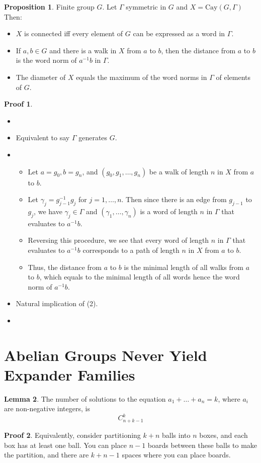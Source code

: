 \documentclass{book}
\newcommand{\Cay}[1]{\textrm{Cay}( #1 )}
\theoremstyle{definition}
\newtheorem{lemma}{Lemma}[chapter]
\newtheorem{proposition}[lemma]{Proposition}
\theoremstyle{remarkstyle}
\newtheorem*{myproof}{Proof}%
\begin{document}
\begin{proposition}
    Finite group $G$. Let $\Gamma$ symmetric in $G$ and $X = \Cay{G, \Gamma}$ Then:
    \begin{itemize}
        \item[1] $X$ is connected iff every element of $G$ can be expressed as a word in $\Gamma$.
        \item[2] If $a,b\in G$ and there is a walk in $X$ from $a$ to $b$, then the distance from $a$ to $b$ is the word norm of $a^{-1}b $ in $\Gamma$.
        \item[3] The diameter of $X$ equals the maximum of the word norms in $\Gamma$ of elements of $G$.  
    \end{itemize}
\end{proposition}
\begin{myproof}
    \begin{itemize}
        \item[]
        \item[1] Equivalent to say $\Gamma$ generates $G$.
        \item[2] 
        \begin{itemize}
            \item Let $a = g_{0}, b=g_{n} $, and $(g_{0}, g_{1}, \dots, g_{n}) $ be a walk of length $n$ in $X$ from $a$ to $b$. 
            \item Let $\gamma_{j} = g^{-1}_{j-1}g_{j} $ for $j = 1, \dots, n$. Then since there is an edge from $g_{j-1} $ to $g_{j} $, we have $\gamma_{j} \in \Gamma $ and $(\gamma_{1}, \dots, \gamma_{n}) $ is a word of length $n$ in $\Gamma$ that evaluates to $a^{-1}b $. 
            \item Reversing this procedure, we see that every word of length $n$ in $\Gamma$ that evaluates to $a^{-1}b $ corresponds to a path of length $n$ in $X$ from $a$ to $b$. 
            \item Thus, the distance from $a$ to $b$ is the minimal length of all walks from $a$ to $b$, which equals to the minimal length of all words hence the word norm of $a^{-1}b$.
        \end{itemize}
        \item[3] Natural implication of (2).
        \item[] 
    \end{itemize}
\end{myproof}


\section{Abelian Groups Never Yield Expander Families}
\begin{lemma}
    The number of solutions to the equation $a_{1} + \dots + a_{n} = k $, where $a_{i} $ are non-negative integers, is $$C^{k}_{n+k-1} $$
\end{lemma}
\begin{myproof}
    Equivalently, consider partitioning $k+n$ balls into $n$ boxes, and each box has at least one ball. You can place $n-1$ boards between these balls to make the partition, and there are $k+n-1$ spaces where you can place boards. \newline
\end{myproof}
\end{document}
